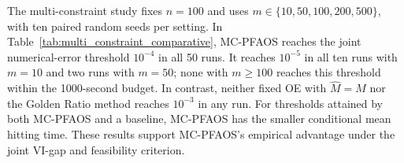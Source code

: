 The multi-constraint study fixes $n=100$ and uses
$m\in\{10,50,100,200,500\}$, with ten paired random seeds per setting.
In Table~\ref{tab:multi_constraint_comparative}, MC-PFAOS reaches the joint
numerical-error threshold $10^{-4}$ in all 50 runs.
It reaches $10^{-5}$ in all ten runs with $m=10$ and two runs with $m=50$;
none with $m\ge100$ reaches this threshold within the 1000-second budget.
In contrast, neither fixed OE with $\widehat M=M$ nor the Golden Ratio
method reaches $10^{-3}$ in any run.
For thresholds attained by both MC-PFAOS and a baseline, MC-PFAOS has the
smaller conditional mean hitting time.
These results support MC-PFAOS's empirical advantage under the joint
VI-gap and feasibility criterion.
